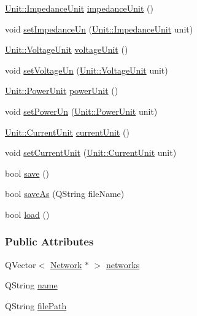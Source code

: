 \begin{DoxyCompactItemize}
\item 
\hyperlink{class_unit_a3747e779c805df24a71961290be3fbdf}{Unit\+::\+Impedance\+Unit} \hyperlink{class_project_ad0725b9aa4445dd6d21d4e15df482d3b}{impedance\+Unit} ()
\item 
void \hyperlink{class_project_a995d050781923522ae2a02728346d199}{set\+Impedance\+Un} (\hyperlink{class_unit_a3747e779c805df24a71961290be3fbdf}{Unit\+::\+Impedance\+Unit} unit)
\item 
\hyperlink{class_unit_a55b07dfa9457e1eca2c7194fe0cfc3c1}{Unit\+::\+Voltage\+Unit} \hyperlink{class_project_a93b928093072ba15c24693b03a934e4e}{voltage\+Unit} ()
\item 
void \hyperlink{class_project_aa26b488b2e93c8a8c6b4423ce07df4a1}{set\+Voltage\+Un} (\hyperlink{class_unit_a55b07dfa9457e1eca2c7194fe0cfc3c1}{Unit\+::\+Voltage\+Unit} unit)
\item 
\hyperlink{class_unit_ace265ae255370ccacfd5370337572c3b}{Unit\+::\+Power\+Unit} \hyperlink{class_project_a2a1bc35358d6189695d6e5b7dd547ffd}{power\+Unit} ()
\item 
void \hyperlink{class_project_aa46b8645d2047c1a2e8d329b9ebbc120}{set\+Power\+Un} (\hyperlink{class_unit_ace265ae255370ccacfd5370337572c3b}{Unit\+::\+Power\+Unit} unit)
\item 
\hyperlink{class_unit_a0794cf6c9682f48296dd4a5315389787}{Unit\+::\+Current\+Unit} \hyperlink{class_project_a0d22341fcc068be743b776df0a02f55e}{current\+Unit} ()
\item 
void \hyperlink{class_project_a64d9800bc3acafcfa4d3f45ee5aacc6d}{set\+Current\+Unit} (\hyperlink{class_unit_a0794cf6c9682f48296dd4a5315389787}{Unit\+::\+Current\+Unit} unit)
\item 
bool \hyperlink{class_project_a596a875bc5be73bc5b1b71b6448c1e07}{save} ()
\item 
bool \hyperlink{class_project_ad32a31d548ad38f4cbbe0f95879a68e5}{save\+As} (Q\+String file\+Name)
\item 
bool \hyperlink{class_project_a1e373892a0383371132ce68fa5f8813d}{load} ()
\end{DoxyCompactItemize}
\subsubsection*{Public Attributes}
\begin{DoxyCompactItemize}
\item 
Q\+Vector$<$ \hyperlink{class_network}{Network} $\ast$ $>$ \hyperlink{class_project_a28c99cc1f0568fbc6f2428894acf3c3a}{networks}
\item 
Q\+String \hyperlink{class_project_a82dd2d1bc38f9fd08c9a811fcaa76b38}{name}
\item 
Q\+String \hyperlink{class_project_a79f30adcefd0b72bd4ac7db724bc9531}{file\+Path}
\end{DoxyCompactItemize}



